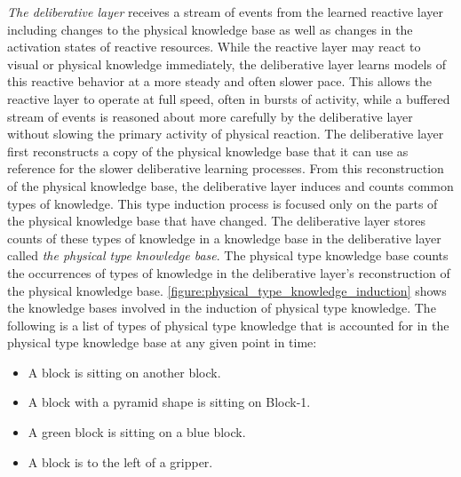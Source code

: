 \emph{The deliberative layer} receives a stream of events from the
learned reactive layer including changes to the physical knowledge
base as well as changes in the activation states of reactive
resources.  While the reactive layer may react to visual or physical
knowledge immediately, the deliberative layer learns models of this
reactive behavior at a more steady and often slower pace.  This allows
the reactive layer to operate at full speed, often in bursts of
activity, while a buffered stream of events is reasoned about more
carefully by the deliberative layer without slowing the primary
activity of physical reaction.  The deliberative layer first
reconstructs a copy of the physical knowledge base that it can use as
reference for the slower deliberative learning processes.  From this
reconstruction of the physical knowledge base, the deliberative layer
induces and counts common types of knowledge.  This type induction
process is focused only on the parts of the physical knowledge base
that have changed.  The deliberative layer stores counts of these
types of knowledge in a knowledge base in the deliberative layer
called \emph{the physical type knowledge base}.  The physical type
knowledge base counts the occurrences of types of knowledge in the
deliberative layer's reconstruction of the physical knowledge base.
{\mbox{\autoref{figure:physical_type_knowledge_induction}}} shows the
knowledge bases involved in the induction of physical type knowledge.
The following is a list of types of physical type knowledge that is
accounted for in the physical type knowledge base at any given point
in time:
\begin{itemize}
\item A block is sitting on another block.
\item A block with a pyramid shape is sitting on Block-1.
\item A green block is sitting on a blue block.
\item A block is to the left of a gripper.
\end{itemize}
